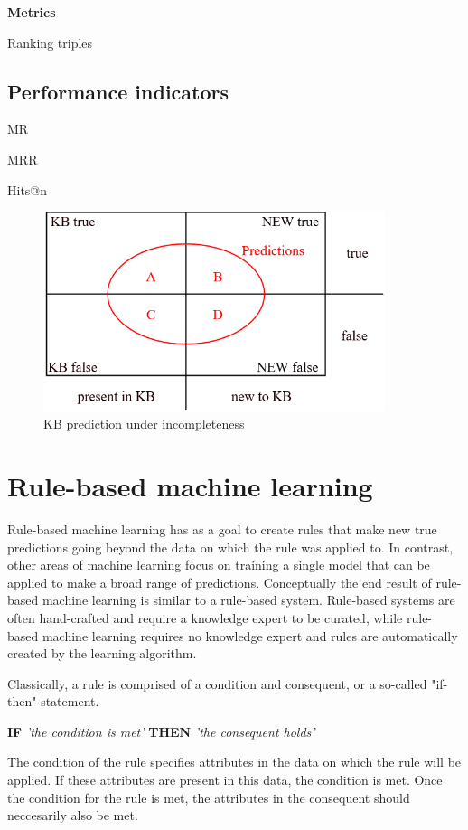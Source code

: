 \textbf{Metrics}

    Ranking triples
    
\subsection{Performance indicators}

    MR

    MRR

    Hits@n
    
    
\begin{figure}[htp]
    \centering
    \includegraphics[width=10cm]{figures/kb_venn.png}
    \caption{KB prediction under incompleteness}
\end{figure}


\section{Rule-based machine learning}
Rule-based machine learning has as a goal to create rules that make new true predictions going beyond the data on which the rule was applied to. In contrast, other areas of machine learning focus on training a single model that can be applied to make a broad range of predictions. Conceptually the end result of rule-based machine learning is similar to a rule-based system.  Rule-based systems are often hand-crafted and require a knowledge expert to be curated, while rule-based machine learning requires no knowledge expert and rules are automatically created by the learning algorithm.

Classically, a rule is comprised of a condition and consequent, or a so-called "if-then" statement. \begin{center} \textbf{IF} \textit{'the condition is met'} \textbf{THEN} \textit{'the consequent holds'} \end{center}
The condition of the rule specifies attributes in the data on which the rule will be applied. If these attributes are present in this data, the condition is met. Once the condition for the rule is met, the attributes in the consequent should neccesarily also be met.

